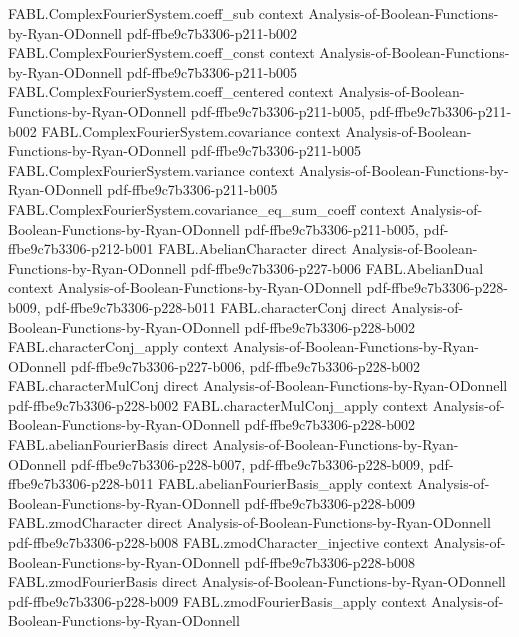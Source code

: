 \begin{theorem}
\proofstep
  {FABL.ComplexFourierSystem.coeff_sub}
  {context}
  {Analysis-of-Boolean-Functions-by-Ryan-ODonnell}
  {pdf-ffbe9c7b3306-p211-b002}
\proofstep
  {FABL.ComplexFourierSystem.coeff_const}
  {context}
  {Analysis-of-Boolean-Functions-by-Ryan-ODonnell}
  {pdf-ffbe9c7b3306-p211-b005}
\proofstep
  {FABL.ComplexFourierSystem.coeff_centered}
  {context}
  {Analysis-of-Boolean-Functions-by-Ryan-ODonnell}
  {pdf-ffbe9c7b3306-p211-b005,
    pdf-ffbe9c7b3306-p211-b002}
\proofstep
  {FABL.ComplexFourierSystem.covariance}
  {context}
  {Analysis-of-Boolean-Functions-by-Ryan-ODonnell}
  {pdf-ffbe9c7b3306-p211-b005}
\proofstep
  {FABL.ComplexFourierSystem.variance}
  {context}
  {Analysis-of-Boolean-Functions-by-Ryan-ODonnell}
  {pdf-ffbe9c7b3306-p211-b005}
\proofstep
  {FABL.ComplexFourierSystem.covariance_eq_sum_coeff}
  {context}
  {Analysis-of-Boolean-Functions-by-Ryan-ODonnell}
  {pdf-ffbe9c7b3306-p211-b005,
    pdf-ffbe9c7b3306-p212-b001}
\proofstep
  {FABL.AbelianCharacter}
  {direct}
  {Analysis-of-Boolean-Functions-by-Ryan-ODonnell}
  {pdf-ffbe9c7b3306-p227-b006}
\proofstep
  {FABL.AbelianDual}
  {context}
  {Analysis-of-Boolean-Functions-by-Ryan-ODonnell}
  {pdf-ffbe9c7b3306-p228-b009,
    pdf-ffbe9c7b3306-p228-b011}
\proofstep
  {FABL.characterConj}
  {direct}
  {Analysis-of-Boolean-Functions-by-Ryan-ODonnell}
  {pdf-ffbe9c7b3306-p228-b002}
\proofstep
  {FABL.characterConj_apply}
  {context}
  {Analysis-of-Boolean-Functions-by-Ryan-ODonnell}
  {pdf-ffbe9c7b3306-p227-b006,
    pdf-ffbe9c7b3306-p228-b002}
\proofstep
  {FABL.characterMulConj}
  {direct}
  {Analysis-of-Boolean-Functions-by-Ryan-ODonnell}
  {pdf-ffbe9c7b3306-p228-b002}
\proofstep
  {FABL.characterMulConj_apply}
  {context}
  {Analysis-of-Boolean-Functions-by-Ryan-ODonnell}
  {pdf-ffbe9c7b3306-p228-b002}
\proofstep
  {FABL.abelianFourierBasis}
  {direct}
  {Analysis-of-Boolean-Functions-by-Ryan-ODonnell}
  {pdf-ffbe9c7b3306-p228-b007,
    pdf-ffbe9c7b3306-p228-b009,
    pdf-ffbe9c7b3306-p228-b011}
\proofstep
  {FABL.abelianFourierBasis_apply}
  {context}
  {Analysis-of-Boolean-Functions-by-Ryan-ODonnell}
  {pdf-ffbe9c7b3306-p228-b009}
\proofstep
  {FABL.zmodCharacter}
  {direct}
  {Analysis-of-Boolean-Functions-by-Ryan-ODonnell}
  {pdf-ffbe9c7b3306-p228-b008}
\proofstep
  {FABL.zmodCharacter_injective}
  {context}
  {Analysis-of-Boolean-Functions-by-Ryan-ODonnell}
  {pdf-ffbe9c7b3306-p228-b008}
\proofstep
  {FABL.zmodFourierBasis}
  {direct}
  {Analysis-of-Boolean-Functions-by-Ryan-ODonnell}
  {pdf-ffbe9c7b3306-p228-b009}
\proofstep
  {FABL.zmodFourierBasis_apply}
  {context}
  {Analysis-of-Boolean-Functions-by-Ryan-ODonnell}

\end{theorem}
